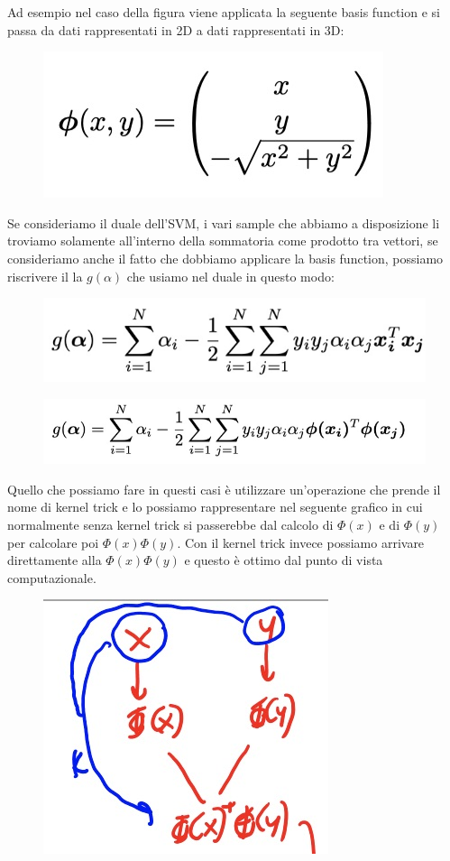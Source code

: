 \documentclass[14pt]{extreport}
\begin{document}
Ad esempio nel caso della figura viene applicata la seguente basis function e si passa da dati rappresentati in 2D a dati rappresentati in 3D:

\begin{figure}[H]
	\centering
	\includegraphics[width=0.3\linewidth]{333.jpeg}
\end{figure}

Se consideriamo il duale dell'SVM, i vari sample che abbiamo a disposizione li troviamo solamente all'interno della sommatoria come prodotto tra
vettori, se consideriamo anche il fatto che dobbiamo applicare la basis function, possiamo riscrivere il la $g(\alpha)$ che usiamo nel duale in questo
modo:

\begin{figure}[H]
	\centering
	\includegraphics[width=0.5\linewidth]{334.jpeg}
\end{figure}
\begin{figure}[H]
	\centering
	\includegraphics[width=0.5\linewidth]{335.jpeg}
\end{figure}

Quello che possiamo fare in questi casi è utilizzare un'operazione che prende il nome di kernel trick e lo possiamo rappresentare nel seguente grafico
in cui normalmente senza kernel trick si passerebbe dal calcolo di $\Phi(x)$ e di $\Phi(y)$ per calcolare poi $\Phi(x)\Phi(y)$. Con il kernel trick
invece possiamo arrivare direttamente alla $\Phi(x)\Phi(y)$ e questo è ottimo dal punto di vista computazionale.

\begin{figure}[H]
	\centering
	\includegraphics[width=0.3\linewidth]{346.jpeg}
\end{figure}
\end{document}

